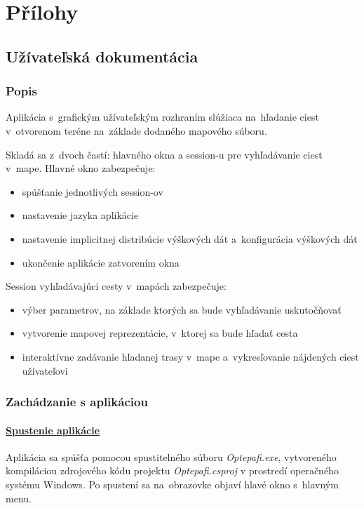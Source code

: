 \documentclass[12pt,a4paper]{report}
\begin{document}
\chapter{Přílohy}

\section{Užívateľská dokumentácia}\label{uzivatelska_dokumentacia}

\subsection{Popis}

Aplikácia s~grafickým užívateľským rozhraním slúžiaca na~hľadanie ciest v~otvorenom teréne na~základe dodaného mapového súboru.

Skladá sa z~dvoch častí: hlavného okna a session-u pre vyhľadávanie ciest v~mape. Hlavné okno zabezpečuje:
\begin{itemize}
    \item spúšťanie jednotlivých session-ov
    \item nastavenie jazyka aplikácie
    \item nastavenie implicitnej distribúcie výškových dát a~konfigurácia výškových dát
    \item ukončenie aplikácie zatvorením okna
\end{itemize}
Session vyhľadávajúci cesty v~mapách zabezpečuje:
\begin{itemize}
    \item výber parametrov, na základe ktorých sa bude vyhľadávanie uskutočňovať
    \item vytvorenie mapovej reprezentácie, v~ktorej sa bude hľadať cesta
    \item interaktívne zadávanie hľadanej trasy v~mape a~vykresľovanie nájdených ciest užívateľovi
\end{itemize}

\subsection{Zachádzanie s aplikáciou}

\subsubsection{\underline{Spustenie aplikácie}}

Aplikácia sa spúšťa pomocou spustitelného súboru \textit{Optepafi.exe}, vytvoreného kompiláciou zdrojového kódu projektu \textit{Optepafi.csproj} v prostredí operačného systému Windows. Po spustení sa na~obrazovke objaví hlavé okno s~hlavným menu.
\end{document}

